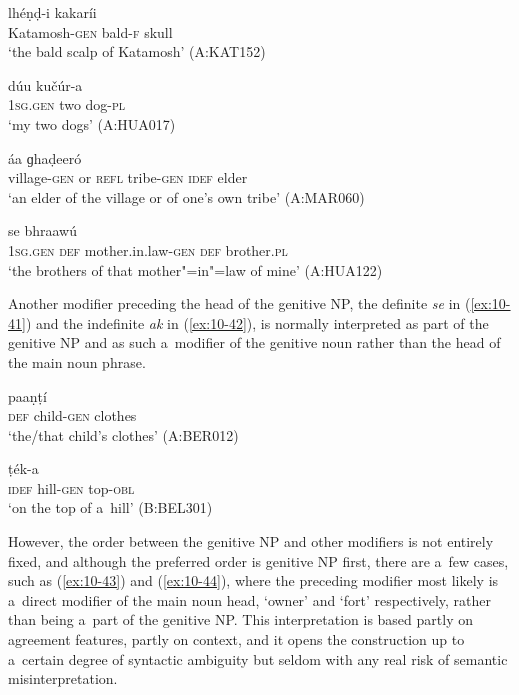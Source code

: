 \begin{exe}
\ex
\label{ex:10-37}
\gll [kaṭamuš-íi] lhéṇḍ-i kakaríi \\
Katamosh-\textsc{gen} bald-\textsc{f} skull \\
\glt `the bald scalp of Katamosh' (A:KAT152)

\ex
\label{ex:10-38}
\gll [míi] dúu kučúr-a \\
\textsc{1sg.gen} two dog-\textsc{pl}  \\
\glt `my two dogs' (A:HUA017)

\ex
\label{ex:10-39}
 áa ɡhaḍeeró  \\
village-\textsc{gen} or \textsc{refl} tribe-\textsc{gen} \textsc{idef} elder \\
\glt `an elder of the village or of one's own tribe' (A:MAR060)

\ex
\label{ex:10-40}
 se bhraawú \\
\textsc{1sg.gen} \textsc{def} mother.in.law-\textsc{gen} \textsc{def} brother.\textsc{pl}  \\
\glt `the brothers of that mother"=in"=law of mine' (A:HUA122)
\end{exe}


Another modifier preceding the head of the genitive NP, the definite \textit{se} in (\ref{ex:10-41}) and the indefinite \textit{ak} in (\ref{ex:10-42}), is normally interpreted as part of the genitive NP and as such a~modifier of the genitive noun rather than the head of the main noun phrase.

\begin{exe}
\ex
\label{ex:10-41}
\gll [se kuṇaak-íi] paaṇṭí \\
\textsc{def} child-\textsc{gen} clothes  \\
\glt `the/that child's clothes' (A:BER012)

\ex
\label{ex:10-42}
\gll [ak táapeṛ-e] ṭék-a \\
\textsc{idef} hill-\textsc{gen} top-\textsc{obl}  \\
\glt `on the top of a~hill' (B:BEL301)
\end{exe}


However, the order between the genitive NP and other modifiers is not entirely fixed, and although the preferred order is genitive NP first, there are a~few cases, such as (\ref{ex:10-43}) and (\ref{ex:10-44}), where the preceding modifier most likely is a~direct modifier of the main noun head, `owner' and `fort' respectively, rather than being a~part of the genitive NP. This interpretation is based partly on agreement features, partly on context, and it opens the construction up to a~certain degree of syntactic ambiguity but seldom with any real risk of semantic misinterpretation.

